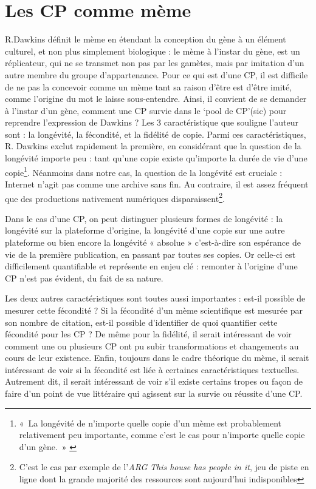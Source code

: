 \documentclass[12pt,a4paper,oneside,titlepage]{book} %
\begin{document}
	\section{Les CP comme mème}
	R.Dawkins définit le mème en étendant la conception du gène à un élément culturel, et non plus simplement biologique : le mème à l’instar du gène, est un réplicateur, qui ne se transmet non pas par les gamètes, mais par imitation d’un autre membre du groupe d’appartenance. Pour ce qui est d’une CP, il est difficile de ne pas la concevoir comme un mème tant sa raison d’être est d’être imité, comme l’origine du mot le laisse sous-entendre. 
	Ainsi, il convient de se demander à l’instar d’un gène, comment une CP survie dans le ‘pool de CP’(sic) pour reprendre l’expression de Dawkins ? 
	Les 3 caractéristique que souligne l’auteur sont : la longévité, la fécondité, et la fidélité de copie. Parmi ces caractéristiques, R. Dawkins exclut rapidement la première, en considérant que la question de la longévité importe peu : tant qu’une copie existe qu’importe la durée de vie d’une copie\footnote{« La longévité de n’importe quelle copie d’un mème est probablement relativement peu importante, comme c’est le cas pour n’importe quelle copie d’un gène. » \cite[voir p.218]{dawkins_gene_2003}}. Néanmoins dans notre cas, la question de la longévité est cruciale : Internet n’agit pas comme une archive sans fin. Au contraire, il est assez fréquent que des productions nativement numériques disparaissent\footnote{C'est le cas par exemple de l'\emph{ARG} \emph{This house has people in it}, jeu de piste en ligne dont la grande majorité des ressources sont aujourd'hui indisponibles}. 
	
	Dans le cas d’une CP, on peut distinguer plusieurs formes de longévité : la longévité sur la plateforme d’origine, la longévité d’une copie sur une autre plateforme ou bien encore la longévité « absolue » c’est-à-dire son espérance de vie de la première publication, en passant par toutes ses copies. Or celle-ci est difficilement quantifiable et représente en enjeu clé : remonter à l’origine d’une CP n’est pas évident, du fait de sa nature.

 Les deux autres caractéristiques sont toutes aussi importantes : est-il possible de mesurer cette fécondité ? Si la fécondité d’un mème scientifique est mesurée par son nombre de citation, est-il possible d’identifier de quoi quantifier cette fécondité pour les CP ? De même pour la fidélité, il serait intéressant de voir comment une ou plusieurs CP ont pu subir transformations et changements au cours de leur existence. Enfin, toujours dans le cadre théorique du mème, il serait intéressant de voir si la fécondité est liée à certaines caractéristiques textuelles. Autrement dit, il serait intéressant de voir s’il existe certains tropes ou façon de faire d’un point de vue littéraire qui agissent sur la survie ou réussite d’une CP.
	
\end{document}
